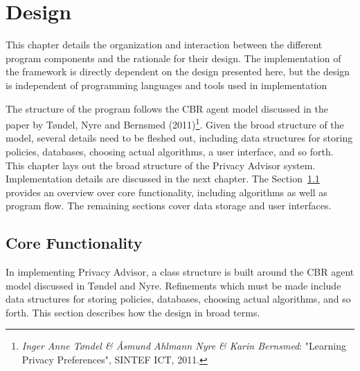  

\chapter{Design}
\label{design}

\minitoc

This chapter details the organization and interaction between the different program components and the rationale for their design. The implementation of the framework is directly dependent on the design presented here, but the design is independent of programming languages and tools used in implementation

The structure of the program follows the CBR agent model discussed in the paper by T{\o}ndel, Nyre and Bernsmed (2011)\footnote{\emph{Inger Anne T{\o}ndel \& {\AA}smund Ahlmann Nyre \& Karin Bernsmed}: "Learning Privacy Preferences", SINTEF ICT, 2011.}. Given the broad structure of the model, several details need to be fleshed out, including data structures for storing policies, databases, choosing actual algorithms, a user interface, and so forth. This chapter lays out the broad structure of the Privacy Advisor system. Implementation details are discussed in the next chapter. The Section~\ref{desOverview} provides an overview over core functionality, including algorithms as well as program flow. The remaining sections cover data storage and user interfaces.


\section{Core Functionality}\label{desOverview}
In implementing Privacy Advisor, a class structure is built around the CBR agent model discussed in T{\o}ndel and Nyre. Refinements which must be made include data structures for storing policies, databases, choosing actual algorithms, and so forth. This section describes how the design in broad terms. 


